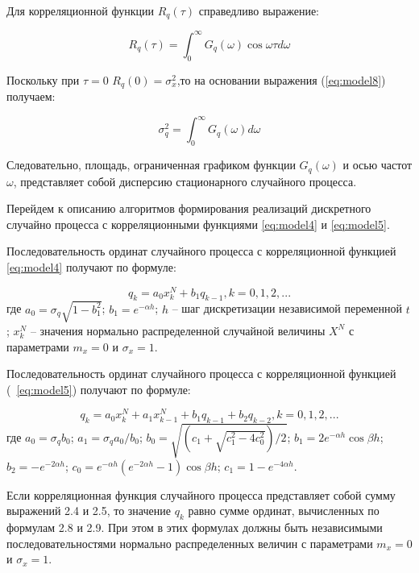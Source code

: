 Для корреляционной функции ${R}_{q}(\tau)$ справедливо выражение:

\begin{equation} \label{eq:model8}
R_q(\tau) = \int_{0}^{\infty} G_q(\omega) \cos\omega\tau d\omega
\end{equation}

Поскольку при $\tau = 0$ $R_q(0) = {\sigma}_{x}^{2}$,то на основании выражения (\ref{eq:model8}) получаем:

\begin{equation} \label{eq:model9}
{\sigma}_{q}^{2} = \int_{0}^{\infty} G_q(\omega) d\omega
\end{equation}

Следовательно, площадь, ограниченная графиком функции $G_q(\omega)$ и осью
частот $\omega$, представляет собой дисперсию стационарного случайного процесса.

Перейдем к описанию алгоритмов формирования реализаций дискретного
случайно процесса с корреляционными функциями \ref{eq:model4} и \ref{eq:model5}.

Последовательность ординат случайного процесса с корреляционной
функцией \ref{eq:model4} получают по формуле:

\begin{equation} \label{eq:model10}
{q}_{k} = a_0 x_{k}^{N} + b_1 q_{k-1}, k=0,1,2,...
\end{equation}
где $a_0 = \sigma_q \sqrt{1 - b_1^2}$;
$b_1 = e^{-\alpha h}$;
$h$ -- шаг дискретизации независимой переменной $t$;
$x_k^N$ -- значения нормально распределенной случайной величины $X^N$ с
параметрами $m_x = 0$ и $\sigma_x = 1$.

Последовательность ординат случайного процесса с корреляционной
функцией (~\ref{eq:model5}) получают по формуле:

\begin{equation} \label{eq:model10}
{q}_{k} = a_0 x_{k}^{N} + a_1 x_{k-1}^{N} +  b_1 q_{k-1} +  b_2 q_{k-2}, k=0,1,2,...
\end{equation}
где $a_0 = \sigma_q b_0$;
$a_1 = \sigma_q a_0 / b_0$;
$b_0 = \sqrt{(c_1 + \sqrt{c_1^2 - 4c_0^2})/2}$;
$b_1 = 2e^{-\alpha h} \cos\beta h$;
$b_2 = -e^{-2\alpha h}$;
$c_0 = e^{-\alpha h} (e^{-2\alpha h} - 1) \cos\beta h$;
$c_1 = 1 - e^{-4\alpha h}$.

Если корреляционная функция случайного процесса представляет собой
сумму выражений 2.4 и 2.5, то значение $q_k$ равно сумме ординат, вычисленных
по формулам 2.8 и 2.9. При этом в этих формулах должны быть
независимыми последовательностями нормально распределенных величин с
параметрами $m_x = 0$ и $\sigma_x = 1$.

